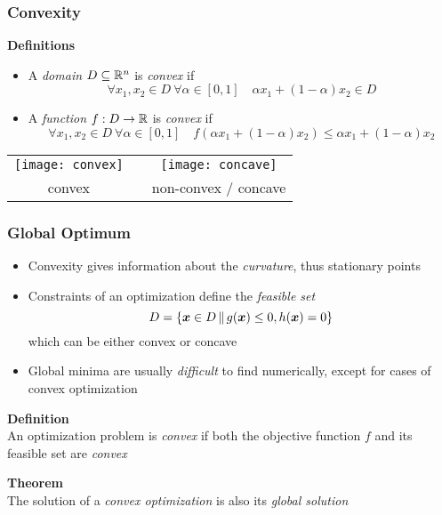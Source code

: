 \documentclass[%
  final,
  11pt, 
  show notes, %
  t, %
  fleqn, %
]{beamer}
\begin{document}
\begin{frame}
  \frametitle{Convexity}
\textbf{Definitions}
\begin{itemize}
\item A \emph{domain} $D \subseteq \mathbb{R}^n$ is \emph{convex} if
\begin{equation*}
\forall x_1, x_2 \in D \ \forall \alpha \in [0,1] \quad \alpha x_1 + (1-\alpha) x_2 \in D
\end{equation*}
\item A \emph{function} $f : D \rightarrow \mathbb{R}$ is \emph{convex} if 
\begin{equation*}
\forall x_1, x_2 \in D \ \forall \alpha \in [0,1] \quad f(\alpha x_1 + (1-\alpha) x_2) \leq \alpha x_1 + (1-\alpha) x_2
\end{equation*}
\end{itemize}
\begin{center}
\begin{tabular}{ccc}
\texttt{[image: convex]} & \hspace*{1cm} & \texttt{[image: concave]} \\
convex & & non-convex / concave
\end{tabular}
\end{center}
\end{frame}

\begin{frame}
  \frametitle{Global Optimum}
\begin{itemize}
\item Convexity gives information about the \emph{curvature}, thus stationary points
\item Constraints of an optimization define the \emph{feasible set} 
\begin{equation*}
D = \left\{ \bm{x} \in D \,\|\, g(\bm{x}) \leq 0, h(\bm{x}) = 0 \right\}
\end{equation*}
which can be either convex or concave
\item Global minima are usually \emph{difficult} to find numerically, except for cases of convex optimization
\end{itemize}

\vspace*{0.4cm}
\textbf{Definition}\\
An optimization problem is \emph{convex} if both the objective function $f$ and its feasible set are \emph{convex}

\vspace*{0.4cm}
\textbf{Theorem} \\
The solution of a \emph{convex optimization} is also its \emph{global solution}
\end{frame}
\end{document}
